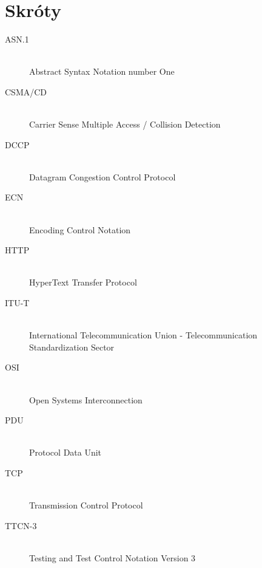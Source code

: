 \documentclass[00-praca-magisterska.tex]{subfiles}
\begin{document}
\chapter{Skróty}

\begin{description}
  \item[ASN.1] \hfill \\ Abstract Syntax Notation number One
  \item[CSMA/CD] \hfill \\ Carrier Sense Multiple Access / Collision Detection
  \item[DCCP] \hfill \\ Datagram Congestion Control Protocol
  \item[ECN] \hfill \\ Encoding Control Notation
  \item[HTTP] \hfill \\ HyperText Transfer Protocol
  \item[ITU-T] \hfill \\ International Telecommunication Union - Telecommunication Standardization Sector
  \item[OSI] \hfill \\ Open Systems Interconnection
  \item[PDU] \hfill \\ Protocol Data Unit
  \item[TCP] \hfill \\ Transmission Control Protocol
  \item[TTCN-3] \hfill \\ Testing and Test Control Notation Version 3
\end{description}
\end{document}
